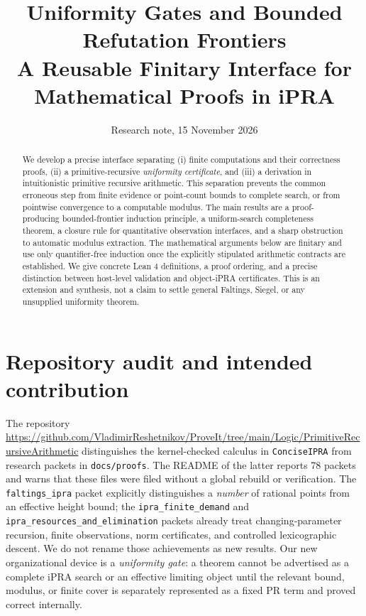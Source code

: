 \documentclass[11pt]{article}
\title{Uniformity Gates and Bounded Refutation Frontiers\\A Reusable Finitary Interface for Mathematical Proofs in iPRA}
\author{Research note, 15 November 2026}
\date{}
\begin{document}
\maketitle
\begin{abstract}
We develop a precise interface separating (i) finite computations and their correctness proofs, (ii) a primitive-recursive \emph{uniformity certificate}, and (iii) a derivation in intuitionistic primitive recursive arithmetic. This separation prevents the common erroneous step from finite evidence or point-count bounds to complete search, or from pointwise convergence to a computable modulus. The main results are a proof-producing bounded-frontier induction principle, a uniform-search completeness theorem, a closure rule for quantitative observation interfaces, and a sharp obstruction to automatic modulus extraction. The mathematical arguments below are finitary and use only quantifier-free induction once the explicitly stipulated arithmetic contracts are established. We give concrete Lean 4 definitions, a proof ordering, and a precise distinction between host-level validation and object-iPRA certificates. This is an extension and synthesis, not a claim to settle general Faltings, Siegel, or any unsupplied uniformity theorem.
\end{abstract}
\tableofcontents
\section{Repository audit and intended contribution}
The repository \url{https://github.com/VladimirReshetnikov/ProveIt/tree/main/Logic/PrimitiveRecursiveArithmetic} distinguishes the kernel-checked calculus in \texttt{ConciseIPRA} from research packets in \texttt{docs/proofs}. The README of the latter reports 78 packets and warns that these files were filed without a global rebuild or verification. The \texttt{faltings\_ipra} packet explicitly distinguishes a \emph{number} of rational points from an effective height bound; the \texttt{ipra\_finite\_demand} and \texttt{ipra\_resources\_and\_elimination} packets already treat changing-parameter recursion, finite observations, norm certificates, and controlled lexicographic descent. We do not rename those achievements as new results. Our new organizational device is a \emph{uniformity gate}: a theorem cannot be advertised as a complete iPRA search or an effective limiting object until the relevant bound, modulus, or finite cover is separately represented as a fixed PR term and proved correct internally.
\end{document}

